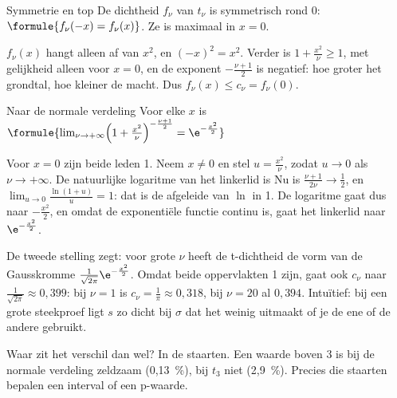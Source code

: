 \begin{theorie}
\begin{stelling}{Symmetrie en top}
De dichtheid $f_\nu$ van $t_\nu$ is symmetrisch rond 0: \quad $\formule{f_\nu(-x) = f_\nu(x)}$. Ze is maximaal in $x = 0$.
\end{stelling}

\begin{bewijs}
$f_\nu(x)$ hangt alleen af van $x^2$, en $(-x)^2 = x^2$. Verder is $1 + \frac{x^2}{\nu} \geqslant 1$, met gelijkheid alleen voor $x = 0$, en de exponent $-\frac{\nu + 1}{2}$ is negatief: hoe groter het grondtal, hoe kleiner de macht. Dus $f_\nu(x) \leqslant c_\nu = f_\nu(0)$.
\end{bewijs}

\begin{stelling}{Naar de normale verdeling}
Voor elke $x$ is \quad $\formule{\lim_{\nu \to +\infty} \Bigl(1 + \frac{x^2}{\nu}\Bigr)^{-\frac{\nu + 1}{2}} = \e^{-\frac{x^2}{2}}}$
\end{stelling}

\begin{bewijs}
Voor $x = 0$ zijn beide leden 1. Neem $x \neq 0$ en stel $u = \frac{x^2}{\nu}$, zodat $u \to 0$ als $\nu \to +\infty$. De natuurlijke logaritme van het linkerlid is
Nu is $\frac{\nu + 1}{2\nu} \to \frac12$, en $\lim_{u \to 0} \frac{\ln(1 + u)}{u} = 1$: dat is de afgeleide van $\ln$ in 1. De logaritme gaat dus naar $-\frac{x^2}{2}$, en omdat de exponentiële functie continu is, gaat het linkerlid naar $\e^{-\frac{x^2}{2}}$.
\end{bewijs}
\end{theorie}

De tweede stelling zegt: voor grote $\nu$ heeft de t-dichtheid de vorm van de Gausskromme $\frac{1}{\sqrt{2\pi}}\e^{-\frac{x^2}{2}}$. Omdat beide oppervlakten 1 zijn, gaat ook $c_\nu$ naar $\frac{1}{\sqrt{2\pi}} \approx 0{,}399$: bij $\nu = 1$ is $c_\nu = \frac1\pi \approx 0{,}318$, bij $\nu = 20$ al $0{,}394$. Intuïtief: bij een grote steekproef ligt $s$ zo dicht bij $\sigma$ dat het weinig uitmaakt of je de ene of de andere gebruikt.

Waar zit het verschil dan wel? In de staarten. Een waarde boven 3 is bij de normale verdeling zeldzaam (0,13~\%), bij $t_3$ niet (2,9~\%). Precies die staarten bepalen een interval of een p-waarde.

